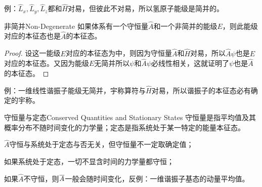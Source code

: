 例：$\hat L_x,\hat L_y,\hat L_z$都和$\hat H$对易，但彼此不对易，所以氢原子能级是简并的。
\begin{theorem}{非简并}{Non-Degenerate}
	如果体系有一个守恒量$\hat A$和一个非简并的能级$E$，则此能级对应的本征态也是$\hat A$的本征态。
\end{theorem}
\begin{proof}
	设这一能级$E$对应的本征态为中，则因为守恒量$\hat A$和$\hat H$对易，所以$\hat A\psi$也是$E$对应的本征态。又因为能级$E$无简并所以$\psi$和$\hat A\psi$必线性相关，这就证明了$\psi$也是$\hat A$的本征态。
\end{proof}
例：一维线性谐振子能级无简并，宇称算符与$\hat H$对易，所以谐振子的本征态必有确定的宇称。
\begin{theorem}{守恒量与定态}{Conserved Quantities and Stationary States}
	守恒量是指平均值及其概率分布不随时间变化的力学量；定态是指系统处于某一特定的能量本征态。
	\begin{compactenum}
		\item $\hat A$守恒与系统处于定态与否无关，但守恒量不一定取确定值；
		\item 如果系统处于定态，一切不显含时间的力学量都守恒；
		\item 如果$\hat A$不守恒，则$\overline{A}$一般会随时间变化，反例：一维谐振子基态的动量平均值。
	\end{compactenum}
\end{theorem}
